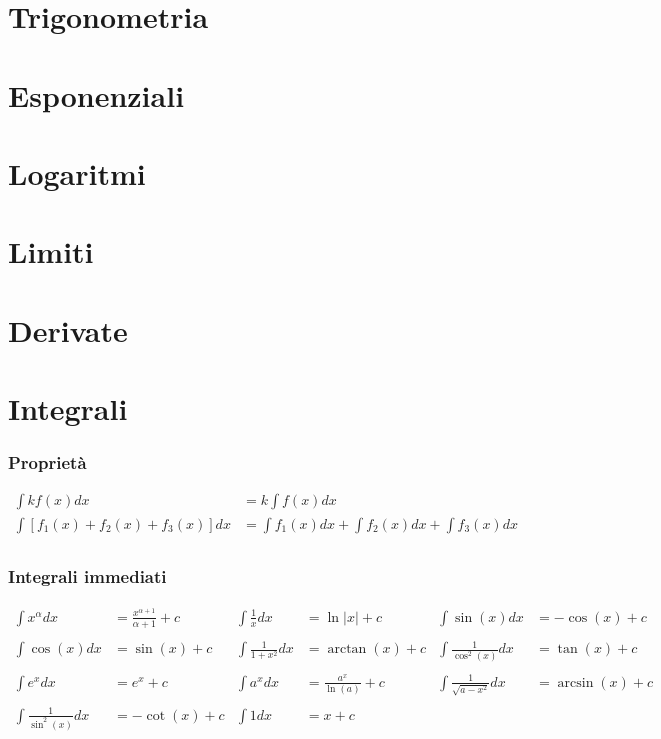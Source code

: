\documentclass[a4paper]{article}
\begin{document}
	
	\newpage
	\section{Trigonometria}
	\newpage
	\section{Esponenziali}
	\newpage
	\section{Logaritmi}
	\newpage
	\section{Limiti}
	\newpage
	\section{Derivate}
	\newpage
	\section{Integrali}
	\subsubsection*{Proprietà}
	\begin{align*}
		\int k f(x) dx &= k \int f(x) dx\\
		\int \left[f_1(x)+f_2(x)+f_3(x)\right]dx &= \int f_1(x)dx + \int f_2(x)dx + \int f_3(x)dx\\
	\end{align*}
	
	\subsubsection*{Integrali immediati}
	\begin{align*}
		\int x^\alpha dx            & = \frac{x^{\alpha + 1}}{\alpha + 1} +c & \int \frac{1}{x}dx     & = \ln|x| + c              & \int \sin (x) dx              & = -\cos(x) + c    \\
		                            &                                        &  \\
		\int \cos (x) dx            & = \sin (x) +c                          & \int \frac{1}{1+x^2}dx & = \arctan (x) +c          & \int \frac{1}{\cos^2 (x)}dx   & = \tan (x) + c    \\
		                            &                                        &  \\
		\int e^x dx                 & = e^x +c                               & \int a^x dx            & = \frac{a^x}{\ln (a)} + c & \int \frac{1}{\sqrt{a-x^2}}dx & = \arcsin (x) + c \\
		                            &  \\
		\int \frac{1}{\sin^2 (x)}dx & = -\cot(x) + c                         & \int 1 dx              & = x+c                     &\\
	\end{align*}
	
\end{document}
